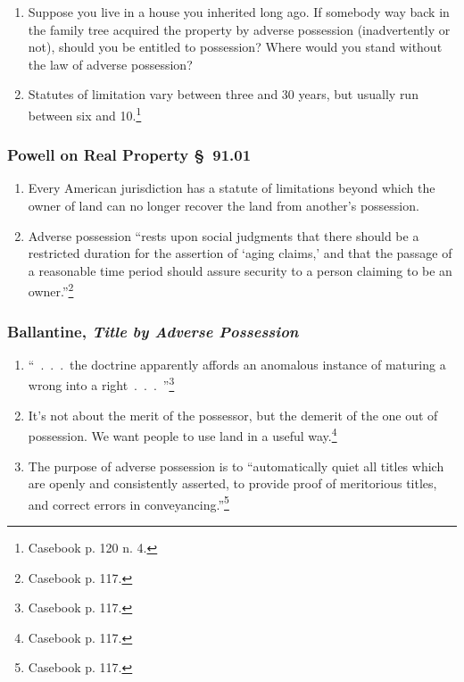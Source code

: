 \begin{enumerate}
    If B takes possession of A's cow, and then the cow has a calf, and then B  
    gets title to the cow by adverse possession, B also owns the calf---even 
    though the calf was born before B had title to its 
    mother.\footnote{Casebook p. 119 n. 2.}
    \item Suppose you live in a house you inherited long ago. If somebody way 
    back in the family tree acquired the property by adverse possession 
    (inadvertently or not), should you be entitled to possession? Where would 
    you stand without the law of adverse possession?
    \item Statutes of limitation vary between three and 30 years, but usually 
    run between six and 10.\footnote{Casebook p. 120 n. 4.}
    \end{enumerate}

\subsubsection{Powell on Real Property \S\ 91.01}

\begin{enumerate}
    \item Every American jurisdiction has a statute of limitations beyond 
    which the owner of land can no longer recover the land from another's 
    possession.
    \item Adverse possession ``rests upon social judgments that there should 
    be a restricted duration for the assertion of `aging claims,' and that the 
    passage of a reasonable time period should assure security to a person 
    claiming to be an owner.''\footnote{Casebook p. 117.}
\end{enumerate}

\subsubsection{Ballantine, \emph{Title by Adverse Possession}}

\begin{enumerate}
    \item ``~.~.~.~the doctrine apparently affords an anomalous instance of 
    maturing a wrong into a right~.~.~.~''\footnote{Casebook p. 117.}
    \item It's not about the merit of the possessor, but the demerit of the 
    one out of possession. We want people to use land in a useful 
    way.\footnote{Casebook p. 117.}
    \item The purpose of adverse possession is to ``automatically quiet all 
    titles which are openly and consistently asserted, to provide proof of 
    meritorious titles, and correct errors in 
    conveyancing.''\footnote{Casebook p. 117.}
\end{enumerate}


